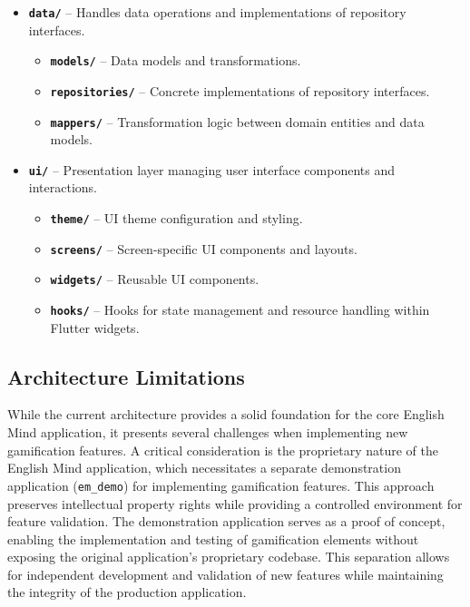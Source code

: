 \begin{itemize}
    \item \textbf{\texttt{data/}} – Handles data operations and implementations of repository interfaces.
    \begin{itemize}
        \item \textbf{\texttt{models/}} – Data models and transformations.
        \item \textbf{\texttt{repositories/}} – Concrete implementations of repository interfaces.
        \item \textbf{\texttt{mappers/}} – Transformation logic between domain entities and data models.
    \end{itemize}
    
    \item \textbf{\texttt{ui/}} – Presentation layer managing user interface components and interactions.
    \begin{itemize}
        \item \textbf{\texttt{theme/}} – UI theme configuration and styling.
        \item \textbf{\texttt{screens/}} – Screen-specific UI components and layouts.
        \item \textbf{\texttt{widgets/}} – Reusable UI components.
        \item \textbf{\texttt{hooks/}} – Hooks for state management and resource handling within Flutter widgets.
    \end{itemize}
\end{itemize}

\subsection{Architecture Limitations}
\label{sec:architecture-limitations}

While the current architecture provides a solid foundation for the core English Mind application, it presents several challenges when implementing new gamification features. A critical consideration is the proprietary nature of the English Mind application, which necessitates a separate demonstration application (\texttt{em\_demo}) for implementing gamification features. This approach preserves intellectual property rights while providing a controlled environment for feature validation. The demonstration application serves as a proof of concept, enabling the implementation and testing of gamification elements without exposing the original application's proprietary codebase. This separation allows for independent development and validation of new features while maintaining the integrity of the production application.

